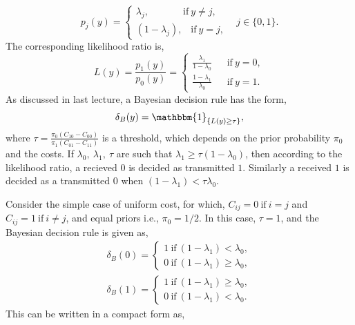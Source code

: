 \documentclass[a4paper,english,12pt]{article}
\begin{document}
\begin{exmp}
\begin{equation}
p_{j}\left( y\right) =\begin{cases}
 \lambda_{j} ,\hspace{42pt}\mbox{if}~y\neq j,\\
 \left( 1-\lambda_{j}\right),\hspace{10pt}\mbox{if}~ y=j,
\end{cases}
\hspace{10pt}j \in \{0,1\}.
\end{equation}
The corresponding likelihood ratio is,
\begin{equation}
L(y) = \frac{p_1(y)}{p_0(y)} = 
\begin{cases}
	\frac{\lambda_1}{1-\lambda_0} ~~~~~~~\mbox{if}~ y=0, \\
	 \frac{1-\lambda_1}{\lambda_0} ~~~~~~~\mbox{if}~ y=1.
\end{cases}
\end{equation}
As discussed in last lecture, a Bayesian decision rule has the form,
\begin{equation}
\delta_B(y)=\mathbbm{1}_{\{L(y)\geq \tau\}},
\end{equation}
where $\tau= \frac{\pi_0(C_{10}-C_{00})}{\pi_1(C_{01}-C_{11})}$ is a threshold, which depends on the prior probability $\pi_0$ and the costs. If $\lambda_0,~\lambda_1,~\tau$  are such that $\lambda_1\geq \tau\left( 1-\lambda_0\right) $, then according to the likelihood ratio, a recieved $0$ is decided as transmitted $1$. Similarly a received $1$ is decided as a transmitted $0$ when $(1-\lambda_1)<\tau \lambda_0$.
\par Consider the simple case of uniform cost, for which, $C_{ij} = 0~ \mbox{if}~ i=j$ and $C_{ij} = 1~ \mbox{if} ~i\neq j$, and equal priors i.e.,  $\pi_0=1/2$. In this case, $\tau=1$, and the Bayesian decision rule is given as,
\begin{eqnarray}
\delta_{B}(0)=
\begin{cases}
1~\mbox{if}~(1-\lambda_1)<\lambda_0,\\ 
0~\mbox{if}~(1-\lambda_1)\geq\lambda_0,
\end{cases}\\ \nonumber
\delta_{B}(1)=\begin{cases}
1~\mbox{if}~(1-\lambda_1)\geq\lambda_0,\\
0~\mbox{if}~(1-\lambda_1)<\lambda_0.
\end{cases}
\end{eqnarray}
This can be written in a compact form as,
\begin{equation}

\end{equation}
\end{exmp}
\end{document}
